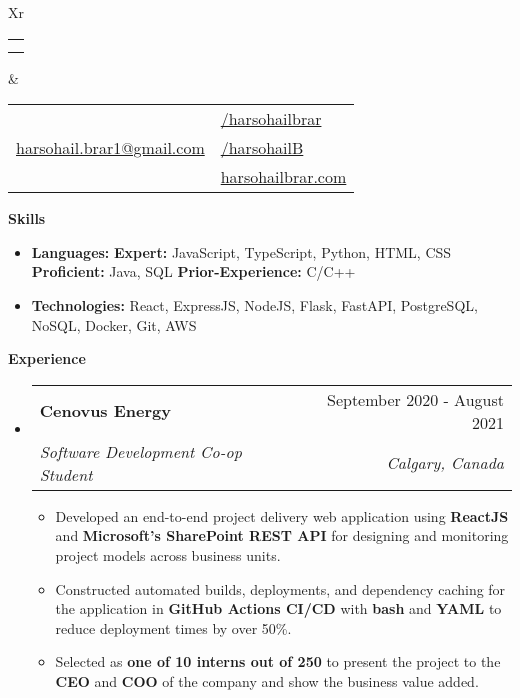 \documentclass[letterpaper,12pt]{article}[leftmargin=*]
\makeatletter
\def \fullname {Harsohail Brar}
\def \subtitle {}
\def \linkedinicon {\faLinkedin}
\def \linkedinlink {https://www.linkedin.com/in/harsohailbrar/}
\def \linkedintext {/harsohailbrar}
\def \phoneicon {\faPhone}
\def \phonetext {+1-204-218-7511}
\def \emailicon {\faEnvelope}
\def \emaillink {mailto:harsohail.brar1@gmail.com}
\def \emailtext {harsohail.brar1@gmail.com}
\def \githubicon {\faGithub}
\def \githublink {https://github.com/harsohailB}
\def \githubtext {/harsohailB}
\def \websiteicon {\faGlobe}
\def \websitelink {https://www.harsohailbrar.com}
\def \websitetext {harsohailbrar.com}
\def \headertype {\doublecol} %
\def \entryspacing {-0pt}
\def \linkedin {\linkedinicon \hspace{3pt}\href{\linkedinlink}{\linkedintext}}
\def \phone {\phoneicon \hspace{3pt}{ \phonetext}}
\def \email {\emailicon \hspace{3pt}\href{\emaillink}{\emailtext}}
\def \github {\githubicon \hspace{3pt}\href{\githublink}{\githubtext}}
\def \website {\websiteicon \hspace{3pt}\href{\websitelink}{\websitetext}}
\renewcommand{\section}[2]{\vspace{5pt}
  \colorbox{secondary}{\color{white}\raggedbottom\normalsize\textbf{{#1}{\hspace{7pt}#2}}}
}
\newcommand{\resumeEntryStart}{\begin{itemize}[leftmargin=2.5mm]}
\newcommand{\resumeEntryEnd}{\end{itemize}\vspace{\entryspacing}}
\newcommand{\resumeItemListStart}{\begin{itemize}[leftmargin=4.5mm]}
\newcommand{\resumeItemListEnd}{\end{itemize}}
\newcommand{\resumeItem}[1]{
  \item\small{
    {#1 \vspace{-2pt}}
  }
}
\newcommand{\resumeEntryTSDL}[4]{
  \vspace{-1pt}\item[]
    \begin{tabularx}{0.97\textwidth}{X@{\hspace{60pt}}r}
      \textbf{\color{primary}#1} & {\firabook\color{accent}\small#2} \\
      \textit{\color{accent}\small#3} & \textit{\color{accent}\small#4} \\
    \end{tabularx}\vspace{-6pt}
}
\newcommand{\resumeEntryS}[2]{
  \item[]\small{
    \textbf{\color{primary}#1 }{ #2 \vspace{-6pt}}
  }
}
\newcommand{\doublecol}[6]{
  \begin{tabularx}{\textwidth}{Xr}
    {
      \begin{tabular}[c]{l}
        \fontsize{35}{45}\selectfont{\color{primary}{{\textbf{\fullname}}}} \\
        {\textit{\subtitle}} %
      \end{tabular}
    } & {
      \begin{tabular}[c]{l@{\hspace{1.5em}}l}
        {\small#4} & {\small#1} \\
        {\small#5} & {\small#2} \\
        {\small#6} & {\small#3}
      \end{tabular}
    }
  \end{tabularx}
}
\newcommand{\singlecol}[6]{
  \begin{tabularx}{\textwidth}{Xr}
    {
      \begin{tabular}[b]{l}
        \fontsize{35}{45}\selectfont{\color{primary}{{\textbf{\fullname}}}} \\
        {\textit{\subtitle}} %
      \end{tabular}
    } & {
      \begin{tabular}[c]{l}
        {\small#1} \\
        {\small#2} \\
        {\small#3} \\
        {\small#4} \\
        {\small#5} \\
        {\small#6}
      \end{tabular}
    }
  \end{tabularx}
}
\makeatother
\begin{document}


\headertype{\linkedin}{\github}{\website}{\phone}{\email}{} %
\vspace{-10pt} %

\section{\faGears}{Skills}
\vspace{5pt}
 \resumeEntryStart
  \resumeEntryS{Languages: \hspace{13pt}} {{\bf Expert:} JavaScript, TypeScript, Python, HTML, CSS {\bf Proficient:} Java, SQL {\bf Prior-Experience:} C/C++}
  \resumeEntryS{Technologies: } {React, ExpressJS, NodeJS, Flask, FastAPI, PostgreSQL, NoSQL, Docker, Git, AWS}
  \vspace{5pt}
 \resumeEntryEnd
 
\section{\faPieChart}{Experience}

  \resumeEntryStart
    \resumeEntryTSDL
      {Cenovus Energy}{September 2020 - August 2021}
      {Software Development Co-op Student}{Calgary, Canada}
    \resumeItemListStart
      \resumeItem {Developed an end-to-end project delivery web application using {\bf ReactJS} and {\bf Microsoft’s SharePoint REST API} for
designing and monitoring project models across business units.}
      \resumeItem {Constructed automated builds, deployments, and dependency caching for the application in {\bf GitHub Actions CI/CD}
with {\bf bash} and {\bf YAML} to reduce deployment times by over 50\%.}
      \resumeItem {Selected as {\bf one of 10 interns out of 250} to present the project to the {\bf CEO} and {\bf COO} of the company and show
    the business value added.}
    \resumeItemListEnd
  \resumeEntryEnd

\end{document}
